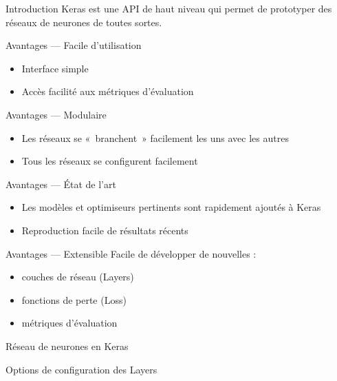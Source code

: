 \begin{frame}{Introduction}
  Keras est une API de haut niveau qui permet de prototyper des réseaux de neurones de toutes sortes.

\end{frame}

\begin{frame}{Avantages --- Facile d'utilisation}
  \begin{itemize}
    \item Interface simple
    \item Accès facilité aux métriques d'évaluation
  \end{itemize}
\end{frame}

\begin{frame}{Avantages --- Modulaire}
  \begin{itemize}
    \item Les réseaux se «~branchent~» facilement les uns avec les autres
    \item Tous les réseaux se configurent facilement
  \end{itemize}
\end{frame}

\begin{frame}{Avantages --- État de l'art}
  \begin{itemize}
    \item Les modèles et optimiseurs pertinents sont rapidement ajoutés à Keras
    \item Reproduction facile de résultats récents
  \end{itemize}
\end{frame}

\begin{frame}{Avantages --- Extensible}
  Facile de développer de nouvelles :
  \begin{itemize}
    \item couches de réseau (Layers)
    \item fonctions de perte (Loss)
    \item métriques d'évaluation
  \end{itemize}
\end{frame}

\begin{frame}{Réseau de neurones en Keras}
\end{frame}

\begin{frame}{Options de configuration des Layers}
\end{frame}

